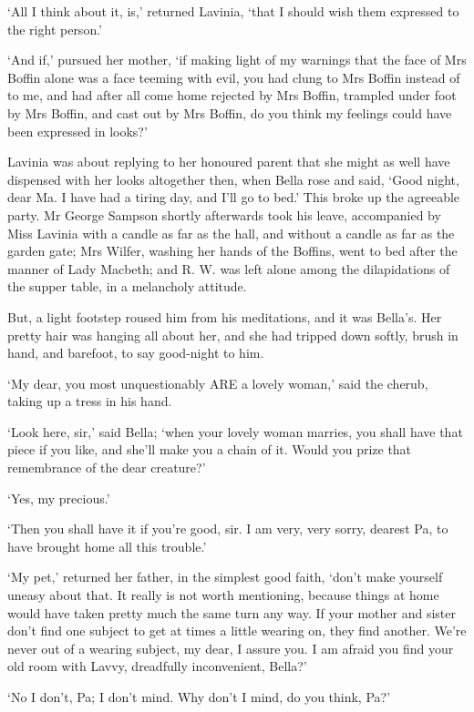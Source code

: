 ‘All I think about it, is,’ returned Lavinia, ‘that I should wish them
expressed to the right person.’

‘And if,’ pursued her mother, ‘if making light of my warnings that the
face of Mrs Boffin alone was a face teeming with evil, you had clung to
Mrs Boffin instead of to me, and had after all come home rejected by Mrs
Boffin, trampled under foot by Mrs Boffin, and cast out by Mrs Boffin,
do you think my feelings could have been expressed in looks?’

Lavinia was about replying to her honoured parent that she might as well
have dispensed with her looks altogether then, when Bella rose and said,
‘Good night, dear Ma. I have had a tiring day, and I’ll go to bed.’ This
broke up the agreeable party. Mr George Sampson shortly afterwards took
his leave, accompanied by Miss Lavinia with a candle as far as the hall,
and without a candle as far as the garden gate; Mrs Wilfer, washing her
hands of the Boffins, went to bed after the manner of Lady Macbeth; and
R. W. was left alone among the dilapidations of the supper table, in a
melancholy attitude.

But, a light footstep roused him from his meditations, and it was
Bella’s. Her pretty hair was hanging all about her, and she had tripped
down softly, brush in hand, and barefoot, to say good-night to him.

‘My dear, you most unquestionably ARE a lovely woman,’ said the cherub,
taking up a tress in his hand.

‘Look here, sir,’ said Bella; ‘when your lovely woman marries, you shall
have that piece if you like, and she’ll make you a chain of it. Would
you prize that remembrance of the dear creature?’

‘Yes, my precious.’

‘Then you shall have it if you’re good, sir. I am very, very sorry,
dearest Pa, to have brought home all this trouble.’

‘My pet,’ returned her father, in the simplest good faith, ‘don’t make
yourself uneasy about that. It really is not worth mentioning, because
things at home would have taken pretty much the same turn any way. If
your mother and sister don’t find one subject to get at times a little
wearing on, they find another. We’re never out of a wearing subject,
my dear, I assure you. I am afraid you find your old room with Lavvy,
dreadfully inconvenient, Bella?’

‘No I don’t, Pa; I don’t mind. Why don’t I mind, do you think, Pa?’

